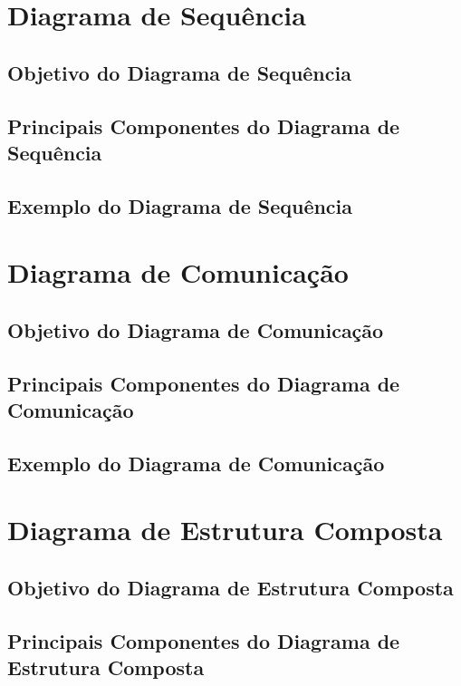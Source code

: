 \documentclass[12pt,openright,oneside,a4paper,
	chapter=TITLE,
	section=TITLE,
	english,brazil]{abntex2}
\begin{document}
\chapter{Diagrama de Sequência}

\section{Objetivo do Diagrama de Sequência}

\section{Principais Componentes do Diagrama de Sequência}

\section{Exemplo do Diagrama de Sequência}

\chapter{Diagrama de Comunicação}

\section{Objetivo do Diagrama de Comunicação}

\section{Principais Componentes do Diagrama de Comunicação}

\section{Exemplo do Diagrama de Comunicação}

\chapter{Diagrama de Estrutura Composta}

\section{Objetivo do Diagrama de Estrutura Composta}

\section{Principais Componentes do Diagrama de Estrutura Composta}
\end{document}
